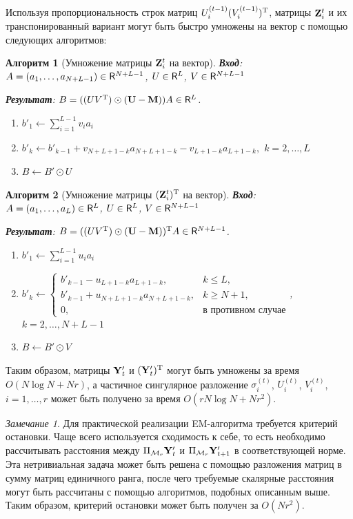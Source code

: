 \documentclass[12pt, specialist, subf,href,colorlinks=true,substylefile = spbu.rtx]{disser}
\newtheorem{algorithm}{Алгоритм}
\theoremstyle{remark}
\newtheorem{remark}{Замечание}
\theoremstyle{definition}
\begin{document}
Используя пропорциональность строк матриц $U_i^{(t-1)} (V_i^{(t-1)})^{\mathrm{T}}$, матрицы $\mathbf{Z}^{t}_i$ и их транспонированный вариант могут быть быстро умножены на вектор с помощью следующих алгоритмов:
\begin{algorithm}[Умножение матрицы $\mathbf{Z}^{t}_i$ на вектор]
	\textbf{Вход}: $A = (a_1, \ldots, a_{N + L - 1}) \in \mathsf{R}^{N + L - 1}$, $U \in \mathsf{R}^L$, $V \in \mathsf{R}^{N + L - 1}$
	
	\textbf{Результат}:
	$B = ((U V^{\mathrm{T}}) \odot (\mathbf{U}-\mathbf{M})) A \in \mathsf{R}^L$.
	
	\begin{enumerate}
		\item
		$b'_1 \leftarrow \sum\limits_{i=1}^{L-1}v_i a_i$
		\item
		$b'_k \leftarrow b'_{k-1} + v_{N + L + 1 - k}a_{N + L + 1 - k} - v_{L + 1 - k}a_{L + 1 - k},$ $k = 2, \ldots, L$
		\item
		$B \leftarrow B' \odot U$
	\end{enumerate}
\end{algorithm}

\begin{algorithm}[Умножение матрицы $(\mathbf{Z}^{t}_i)^{\mathrm{T}}$ на вектор]
	\textbf{Вход}: $A = (a_1, \ldots, a_L) \in \mathsf{R}^L$, $U \in \mathsf{R}^L$, $V \in \mathsf{R}^{N + L - 1}$
	
	\textbf{Результат}:
	$B = ((U V^{\mathrm{T}}) \odot (\mathbf{U}-\mathbf{M}))^{\mathrm{T}} A \in \mathsf{R}^{N + L - 1}$.
	
	\begin{enumerate}
		\item
		$b'_1 \leftarrow \sum\limits_{i=1}^{L - 1}u_i a_i$
		\item
		$b'_k \leftarrow \begin{cases}
		b'_{k - 1} - u_{L + 1 - k} a_{L + 1 - k}, & k \le L, \\
		b'_{k - 1} + u_{N + L + 1 - k} a_{N + L + 1 - k}, & k \ge N + 1,\\
		0, & \text{в противном случае}
		\end{cases}$, $k = 2, \ldots, N + L - 1$
		\item
		$B \leftarrow B' \odot V$
	\end{enumerate}
\end{algorithm}
Таким образом, матрицы $\mathbf{Y}'_t$ и $(\mathbf{Y}'_t)^{\mathrm{T}}$ могут быть умножены за время $O(N \log N + Nr)$, а частичное сингулярное разложение $\sigma_i^{(t)}$, $U_i^{(t)}$, $V_i^{(t)}$, $i = 1, \ldots, r$ может быть получено за время $O(r N \log N + N r^2)$. 
\begin{remark}
	Для практической реализации EM-алгоритма требуется критерий остановки. Чаще всего используется сходимость к себе, то есть необходимо рассчитывать расстояния между $\Pi_{\mathcal{M}_r} \mathbf{Y}'_t$ и $\Pi_{\mathcal{M}_r} \mathbf{Y}'_{t + 1}$ в соответствующей норме. Эта нетривиальная задача может быть решена с помощью разложения матриц в сумму матриц единичного ранга, после чего требуемые скалярные расстояния могут быть рассчитаны с помощью алгоритмов, подобных описанным выше. Таким образом, критерий остановки может быть получен за $O(N r^2)$.
\end{remark}
\end{document}
